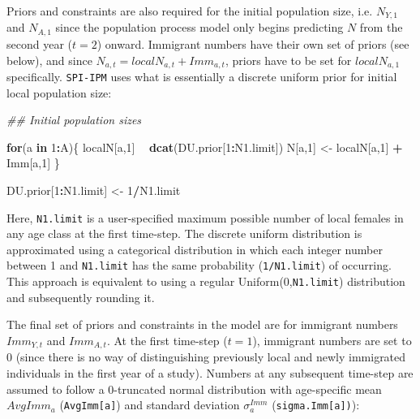 \documentclass[
]{book}
\newenvironment{Shaded}{\begin{snugshade}}{\end{snugshade}}
\newcommand{\CommentTok}[1]{\textcolor[rgb]{0.56,0.35,0.01}{\textit{#1}}}
\newcommand{\ControlFlowTok}[1]{\textcolor[rgb]{0.13,0.29,0.53}{\textbf{#1}}}
\newcommand{\DecValTok}[1]{\textcolor[rgb]{0.00,0.00,0.81}{#1}}
\newcommand{\KeywordTok}[1]{\textcolor[rgb]{0.13,0.29,0.53}{\textbf{#1}}}
\newcommand{\NormalTok}[1]{#1}
\newcommand{\OperatorTok}[1]{\textcolor[rgb]{0.81,0.36,0.00}{\textbf{#1}}}
\newcommand{\StringTok}[1]{\textcolor[rgb]{0.31,0.60,0.02}{#1}}
\begin{document}
Priors and constraints are also required for the initial population size, i.e.
\(N_{Y,1}\) and \(N_{A,1}\) since the population process model only begins
predicting \(N\) from the second year (\(t=2\)) onward. Immigrant numbers have their
own set of priors (see below), and since \(N_{a,t} = localN_{a,t} + Imm_{a,t}\),
priors have to be set for \(localN_{a,1}\) specifically. \texttt{SPI-IPM} uses what is
essentially a discrete uniform prior for initial local population size:

\begin{Shaded}
\begin{Highlighting}[]
\CommentTok{## Initial population sizes}

\ControlFlowTok{for}\NormalTok{(a }\ControlFlowTok{in} \DecValTok{1}\OperatorTok{:}\NormalTok{A)\{}
\NormalTok{  localN[a,}\DecValTok{1}\NormalTok{] }\OperatorTok{~}\StringTok{ }\KeywordTok{dcat}\NormalTok{(DU.prior[}\DecValTok{1}\OperatorTok{:}\NormalTok{N1.limit])}
\NormalTok{  N[a,}\DecValTok{1}\NormalTok{] <-}\StringTok{ }\NormalTok{localN[a,}\DecValTok{1}\NormalTok{] }\OperatorTok{+}\StringTok{ }\NormalTok{Imm[a,}\DecValTok{1}\NormalTok{]}
\NormalTok{\}}

\NormalTok{DU.prior[}\DecValTok{1}\OperatorTok{:}\NormalTok{N1.limit] <-}\StringTok{ }\DecValTok{1}\OperatorTok{/}\NormalTok{N1.limit}
\end{Highlighting}
\end{Shaded}

Here, \texttt{N1.limit} is a user-specified maximum possible number of local females in
any age class at the first time-step. The discrete uniform distribution is
approximated using a categorical distribution in which each integer number between
1 and \texttt{N1.limit} has the same probability (\texttt{1/N1.limit}) of occurring.
This approach is equivalent to using a regular Uniform(0,\texttt{N1.limit}) distribution
and subsequently rounding it.

The final set of priors and constraints in the model are for immigrant numbers
\(Imm_{Y,t}\) and \(Imm_{A,t}\). At the first time-step (\(t=1\)), immigrant numbers
are set to 0 (since there is no way of distinguishing previously local and
newly immigrated individuals in the first year of a study). Numbers at any
subsequent time-step are assumed to follow a 0-truncated normal distribution
with age-specific mean \(AvgImm_a\) (\texttt{AvgImm{[}a{]}}) and standard deviation
\(\sigma_a^{Imm}\) (\texttt{sigma.Imm{[}a{]})}):
\end{document}
